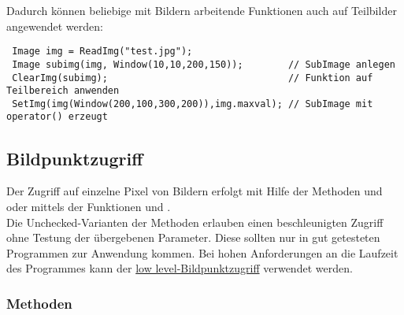 

Dadurch können beliebige mit Bildern arbeitende Funktionen auch auf Teilbilder 
angewendet werden:
\begin{verbatim} 
 Image img = ReadImg("test.jpg");
 Image subimg(img, Window(10,10,200,150));        // SubImage anlegen
 ClearImg(subimg);                                // Funktion auf Teilbereich anwenden
 SetImg(img(Window(200,100,300,200)),img.maxval); // SubImage mit operator() erzeugt
\end{verbatim}

\subsection{Bildpunktzugriff}

Der Zugriff auf einzelne Pixel von Bildern erfolgt mit Hilfe der Methoden
 und  oder mittels der
Funktionen  und . \\
Die Unchecked-Varianten der Methoden erlauben einen 
beschleunigten Zugriff ohne Testung der übergebenen Parameter.
Diese sollten nur in gut getesteten Programmen zur Anwendung kommen.
Bei hohen Anforderungen an die Laufzeit des Programmes kann der 
\hyperref{direct_pixel_access}{}{}{low level-Bildpunktzugriff} verwendet werden.

\subsubsection{Methoden}



